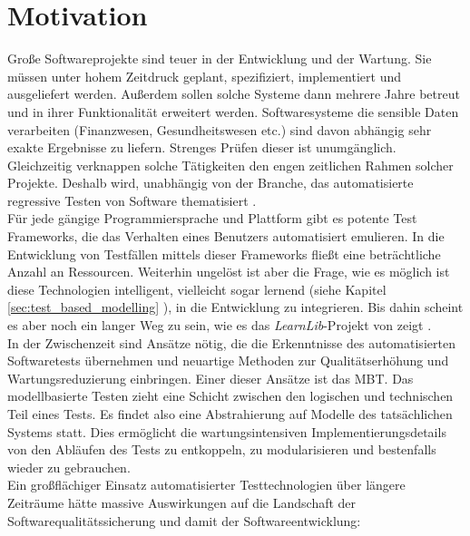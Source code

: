 \section{Motivation}
Große Softwareprojekte sind teuer in der Entwicklung und der Wartung. Sie müssen unter hohem Zeitdruck geplant, spezifiziert, implementiert und ausgeliefert werden. Außerdem sollen solche Systeme dann mehrere Jahre betreut und in ihrer Funktionalität erweitert werden. Softwaresysteme die sensible Daten verarbeiten (Finanzwesen, Gesundheitswesen etc.) sind davon abhängig sehr exakte Ergebnisse zu liefern. Strenges Prüfen dieser ist unumgänglich. Gleichzeitig verknappen solche Tätigkeiten den engen zeitlichen Rahmen solcher Projekte. Deshalb wird, unabhängig von der Branche, das automatisierte regressive Testen von Software thematisiert \cite{graham_experiences_2012}.\\
Für jede gängige Programmiersprache und Plattform gibt es potente Test \Glspl{Framework}, die das Verhalten eines Benutzers automatisiert emulieren. In die Entwicklung von Testfällen mittels dieser \Glspl{Framework} fließt eine beträchtliche Anzahl an Ressourcen. Weiterhin ungelöst ist aber die Frage, wie es möglich ist diese Technologien intelligent, vielleicht sogar lernend (siehe Kapitel \ref{sec:test_based_modelling} ), in die Entwicklung zu integrieren. Bis dahin scheint es aber noch ein langer Weg zu sein, wie es das \textit{LearnLib}-Projekt von \citeauthor{steffen_introduction_2011} zeigt \cite{steffen_introduction_2011}.\\
In der Zwischenzeit sind Ansätze nötig, die die Erkenntnisse des automatisierten Softwaretests übernehmen und neuartige Methoden zur Qualitätserhöhung und Wartungsreduzierung einbringen. Einer dieser Ansätze ist das \Gls{MBT}. Das modellbasierte Testen zieht eine Schicht zwischen den logischen und technischen Teil eines Tests. Es findet also eine Abstrahierung auf Modelle des tatsächlichen Systems statt. Dies ermöglicht die wartungsintensiven Implementierungsdetails von den Abläufen des Tests zu entkoppeln, zu modularisieren und bestenfalls wieder zu gebrauchen.\\
Ein großflächiger Einsatz automatisierter Testtechnologien über längere Zeiträume hätte massive Auswirkungen auf die Landschaft der Softwarequalitätssicherung und damit der Softwareentwicklung:


